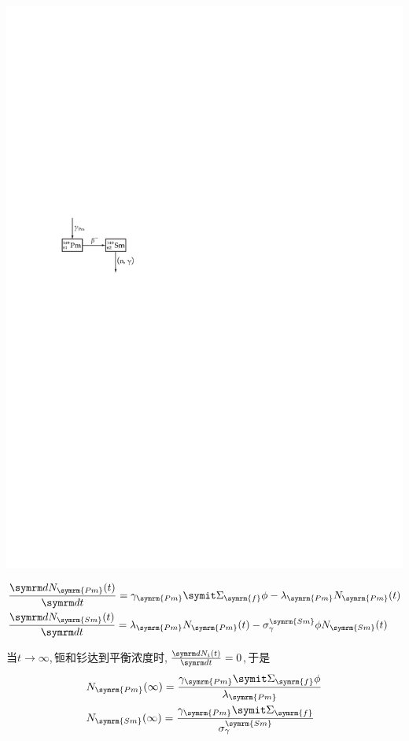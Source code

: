 \begin{exercise}
\begin{solution}
        \begin{minipage}{0.1\columnwidth}
            \includegraphics[scale=0.9]{figures/fig6.8.pdf}
        \end{minipage}
        \hfil
        \begin{minipage}{0.9\columnwidth}
            \begin{align*}
                & \dv{N_{\symrm{Pm}}(t)}{t} = \gamma_{\symrm{Pm}} \vSigma_{\symrm{f}} \phi - \lambda_{\symrm{Pm}} N_{\symrm{Pm}}(t) \\
                & \dv{N_{\symrm{Sm}}(t)}{t} = \lambda_{\symrm{Pm}} N_{\symrm{Pm}}(t) - \sigma_{\gamma}^{\symrm{Sm}} \phi N_{\symrm{Sm}}(t)
            \end{align*}
        \end{minipage}

        当$t \to \infty$,\,钷和钐达到平衡浓度时,\,$\dv{N_i(t)}{t} = 0$,\,于是
        \begin{align*}
            & N_{\symrm{Pm}}(\infty) = \frac{\gamma_{\symrm{Pm}} \vSigma_{\symrm{f}} \phi}{\lambda_{\symrm{Pm}}} \\
            & N_{\symrm{Sm}}(\infty) = \frac{\gamma_{\symrm{Pm}} \vSigma_{\symrm{f}}}{\sigma_{\gamma}^{\symrm{Sm}}}
        \end{align*}
    \end{solution}
\end{exercise}

